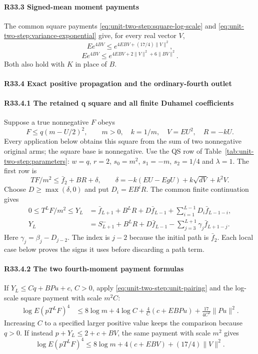 \paragraph{R33.3 Signed-mean moment payments}
The common square payments
\eqref{eq:unit-two-step:square-log-scale} and
\eqref{eq:unit-two-step:variance-exponential} give, for every
real vector $V$,
\[
 Ee^{4BV}\le e^{4EBV+(17/4)\|V\|^2},\tag{R33.A13}
\]
\[
 Ee^{4BV}\le e^{4EBV+2\|V\|^2+6\|BV\|^2}.\tag{R33.A14}
\]
Both also hold with $K$ in place of $B$.

\paragraph{R33.4 Exact positive propagation and the ordinary-fourth outlet}

\paragraph{R33.4.1 The retained q square and all finite Duhamel coefficients}

Suppose a true nonnegative \(F\) obeys
\[
F\le q(m-U/2)^2,\qquad m>0,\quad k=1/m,\quad
V=EU^2,\quad R=-kU.
\]
Every application below obtains this square from the sum of two
nonnegative original arms; the square base is nonnegative.
Use the QS row of Table~\ref{tab:unit-two-step:parameters}:
$w=q$, $r=2$, $s_0=m^2$, $s_1=-m$, $s_2=1/4$ and $\lambda=1$.
The first row is
\[
 TF/m^2\le\bar f_2+BR+\delta,\qquad
 \delta=-k(EU-EgU)+k\sqrt{dV}+k^2V.\tag{R33.A15}
\]
Choose $D\ge\max(\delta,0)$ and put $D_i=EB^iR$.
The common finite continuation gives
\begin{align}
0\le T^LF/m^2\le Y_L
 &=\bar f_{L+1}+B^LR+D\bar f_{L-1}
       +\sum_{i=1}^{L-1}D_i\bar f_{L-1-i},\tag{R33.A16}\\
 Y_L&=S^-_{L+1}+B^LR+D\bar f_{L-1}
       -\sum_{j=3}^{L+1}\gamma_j\bar f_{L+1-j}.\tag{R33.A17}
\end{align}
Here $\gamma_j=\beta_j-D_{j-2}$. The index is $j-2$ because
the initial path is $\bar f_2$. Each local case below proves the
signs it uses before discarding a path term.

\paragraph{R33.4.2 The two fourth-moment payment formulas}

If $Y_L\le Cq+BPu+c$, $C>0$, apply
\eqref{eq:unit-two-step:unit-pairing} and the log-scale square
payment with scale $m^2C$:
\[
\begin{aligned}
 \log E(pT^LF)^4
 &\le8\log m+4\log C+\frac4C(c+EBPu)
                   +\frac{17}{4C^2}\|Pu\|^2.
\end{aligned}\tag{R33.A18}
\]
Increasing $C$ to a specified larger positive value keeps the
comparison because $q>0$. If instead $p+Y_L\le2+c+BV$,
the same payment with scale $m^2$ gives
\[
 \log E(pT^LF)^4
 \le8\log m+4(c+EBV)+(17/4)\|V\|^2.\tag{R33.A19}
\]

